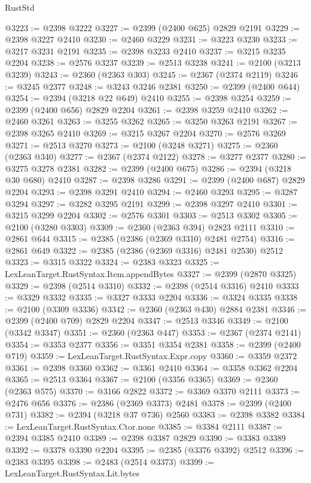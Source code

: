 \begin{lexlean}{RustStd}
\begin{coremodule}
{\begin{coremodule}
{{{{{{{{{{{{{{{{{{{{{{{{{{{{{{{{{{{{{{{{{{{{{{{{{{@3223 := @2398 @3222
@3227 := @2399 (@2400 @625) @2829 @2191
@3229 := @2398 @3227 @2410
@3230 := @2460 @3229
@3231 := @3223 @3230
@3233 := @3217 @3231 @2191
@3235 := @2398 @3233 @2410
@3237 := @3215 @3235 @2204
@3238 := @2576 @3237
@3239 := @2513 @3238
@3241 := @2100 (@3213 @3239)
@3243 := @2360 (@2363 @303)
@3245 := @2367 (@2374 @2119)
@3246 := @3245 @2377
@3248 := @3243 @3246 @2381
@3250 := @2399 (@2400 @644)
@3254 := @2394 (@3218 @22 @649) @2410
@3255 := @2398 @3254
@3259 := @2399 (@2400 @656) @2829 @2204
@3261 := @2398 @3259 @2410
@3262 := @2460 @3261
@3263 := @3255 @3262
@3265 := @3250 @3263 @2191
@3267 := @2398 @3265 @2410
@3269 := @3215 @3267 @2204
@3270 := @2576 @3269
@3271 := @2513 @3270
@3273 := @2100 (@3248 @3271)
@3275 := @2360 (@2363 @340)
@3277 := @2367 (@2374 @2122)
@3278 := @3277 @2377
@3280 := @3275 @3278 @2381
@3282 := @2399 (@2400 @675)
@3286 := @2394 (@3218 @30 @680) @2410
@3287 := @2398 @3286
@3291 := @2399 (@2400 @687) @2829 @2204
@3293 := @2398 @3291 @2410
@3294 := @2460 @3293
@3295 := @3287 @3294
@3297 := @3282 @3295 @2191
@3299 := @2398 @3297 @2410
@3301 := @3215 @3299 @2204
@3302 := @2576 @3301
@3303 := @2513 @3302
@3305 := @2100 (@3280 @3303)
@3309 := @2360 (@2363 @394) @2823 @2111
@3310 := @2861 @644
@3315 := @2385 (@2386 (@2369 @3310) @2481 @2754)
@3316 := @2861 @649
@3322 := @2385 (@2386 (@2369 @3316) @2481 @2530) @2512
@3323 := @3315 @3322
@3324 := @2383 @3323
@3325 := LexLeanTarget.RustSyntax.Item.appendBytes
@3327 := @2399 (@2870 @3325)
@3329 := @2398 (@2514 @3310)
@3332 := @2398 (@2514 @3316) @2410
@3333 := @3329 @3332
@3335 := @3327 @3333 @2204
@3336 := @3324 @3335
@3338 := @2100 (@3309 @3336)
@3342 := @2360 (@2363 @430) @2884 @2381
@3346 := @2399 (@2400 @709) @2829 @2204
@3347 := @2513 @3346
@3349 := @2100 (@3342 @3347)
@3351 := @2360 (@2363 @447)
@3353 := @2367 (@2374 @2141)
@3354 := @3353 @2377
@3356 := @3351 @3354 @2381
@3358 := @2399 (@2400 @719)
@3359 := LexLeanTarget.RustSyntax.Expr.copy
@3360 := @3359 @2372
@3361 := @2398 @3360
@3362 := @3361 @2410
@3364 := @3358 @3362 @2204
@3365 := @2513 @3364
@3367 := @2100 (@3356 @3365)
@3369 := @2360 (@2363 @575)
@3370 := @3166 @2822
@3372 := @3369 @3370 @2111
@3373 := @2476 @656
@3376 := @2386 (@2369 @3373) @2481
@3378 := @2399 (@2400 @731)
@3382 := @2394 (@3218 @37 @736) @2560
@3383 := @2398 @3382
@3384 := LexLeanTarget.RustSyntax.Ctor.none
@3385 := @3384 @2111
@3387 := @2394 @3385 @2410
@3389 := @2398 @3387 @2829
@3390 := @3383 @3389
@3392 := @3378 @3390 @2204
@3395 := @2385 (@3376 @3392) @2512
@3396 := @2383 @3395
@3398 := @2483 (@2514 @3373)
@3399 := LexLeanTarget.RustSyntax.Lit.bytes
}}}}}}}}}}}}}}}}}}}}}}}}}}}}}}}}}}}}}}}}}}}}}}}}}}
\end{coremodule}}
\end{coremodule}
\end{lexlean}
